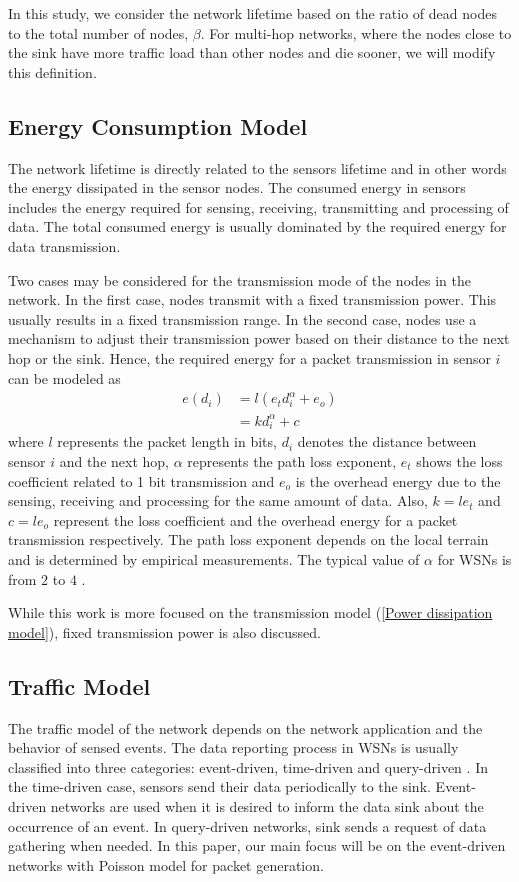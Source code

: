 \documentclass[conference]{IEEEtran}
\begin{document}
In this study, we consider the network lifetime based on the ratio
of dead nodes to the total number of nodes, $\beta$. For multi-hop
networks, where the nodes close to the sink have more traffic load
than other nodes and die sooner, we will modify this definition.

\subsection{Energy Consumption Model}
The network lifetime is directly related to the sensors lifetime
and in other words the energy dissipated in the sensor nodes. The
consumed energy in sensors includes the energy required for sensing,
receiving, transmitting and processing of data. The total consumed
energy is usually dominated by the required energy for data
transmission.

Two cases may be considered for the transmission mode of the nodes
in the network. In the first case, nodes transmit with a fixed
transmission power. This usually results in a fixed transmission
range. In the second case, nodes use a mechanism to adjust their
transmission power based on their distance to the next hop or the
sink. Hence, the required energy for a packet transmission in sensor
$i$ can be modeled as \cite{Hein_Tranmission_model_2000}
\begin{align}
e(d_i)&= l(e_t d_i ^{\alpha} + e_o) \nonumber\\
&=kd_i^{\alpha}+c  \label{Power dissipation model}
\end{align}
where $l$ represents the packet length in bits, $d_i$ denotes the
distance between sensor $i$ and the next hop, $\alpha$ represents
the path loss exponent, $e_t$ shows the loss coefficient related to
1 bit transmission and $e_o$ is the overhead energy due to the
sensing, receiving and processing for the same amount of data. Also,
$k = le_t$ and $c = le_o$ represent the loss coefficient and the
overhead energy for a packet transmission respectively. The path
loss exponent depends on the local terrain and is determined by
empirical measurements. The typical value of $\alpha$ for WSNs is
from $2$ to $4$ \cite{Oym_ICC_2004}.

While this work is more focused on the transmission model
(\ref{Power dissipation model}), fixed transmission power is also
discussed.

\subsection{Traffic Model}
The traffic model of the network depends on the network application
and the behavior of sensed events. The data reporting process in
WSNs is usually classified into three categories: event-driven,
time-driven and query-driven \cite{Al-Karaki_Routing_Magazine2004}.
In the time-driven case, sensors send their data periodically to the
sink. Event-driven networks are used when it is desired to inform
the data sink about the occurrence of an event. In query-driven
networks, sink sends a request of data gathering when needed. In
this paper, our main focus will be on the event-driven networks with
Poisson model for packet generation.
\end{document}
